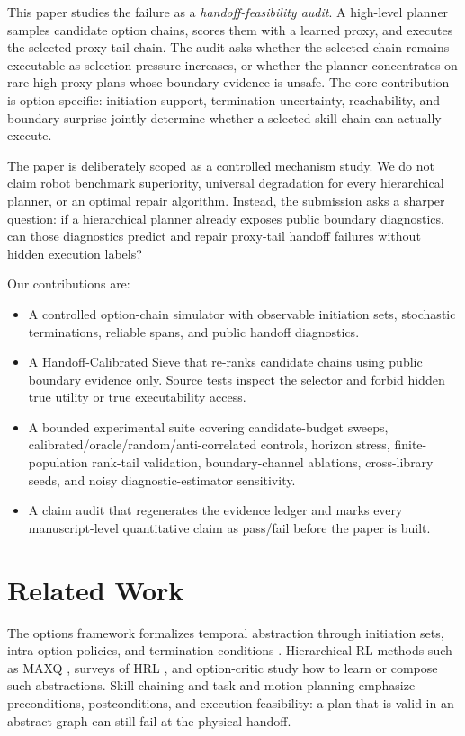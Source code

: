 \documentclass{article}
\begin{document}
This paper studies the failure as a \emph{handoff-feasibility audit}. A high-level planner samples candidate option chains, scores them with a learned proxy, and executes the selected proxy-tail chain. The audit asks whether the selected chain remains executable as selection pressure increases, or whether the planner concentrates on rare high-proxy plans whose boundary evidence is unsafe. The core contribution is option-specific: initiation support, termination uncertainty, reachability, and boundary surprise jointly determine whether a selected skill chain can actually execute.

The paper is deliberately scoped as a controlled mechanism study. We do not claim robot benchmark superiority, universal degradation for every hierarchical planner, or an optimal repair algorithm. Instead, the submission asks a sharper question: if a hierarchical planner already exposes public boundary diagnostics, can those diagnostics predict and repair proxy-tail handoff failures without hidden execution labels?

Our contributions are:
\begin{itemize}
\item A controlled option-chain simulator with observable initiation sets, stochastic terminations, reliable spans, and public handoff diagnostics.
\item A Handoff-Calibrated Sieve that re-ranks candidate chains using public boundary evidence only. Source tests inspect the selector and forbid hidden true utility or true executability access.
\item A bounded experimental suite covering candidate-budget sweeps, calibrated/oracle/random/anti-correlated controls, horizon stress, finite-population rank-tail validation, boundary-channel ablations, cross-library seeds, and noisy diagnostic-estimator sensitivity.
\item A claim audit that regenerates the evidence ledger and marks every manuscript-level quantitative claim as pass/fail before the paper is built.
\end{itemize}

\section{Related Work}

The options framework formalizes temporal abstraction through initiation sets, intra-option policies, and termination conditions \citep{sutton1999between,precup2000temporal}. Hierarchical RL methods such as MAXQ \citep{dietterich2000hierarchical}, surveys of HRL \citep{barto2003recent}, and option-critic \citep{bacon2017optioncritic} study how to learn or compose such abstractions. Skill chaining and task-and-motion planning emphasize preconditions, postconditions, and execution feasibility: a plan that is valid in an abstract graph can still fail at the physical handoff.
\end{document}
